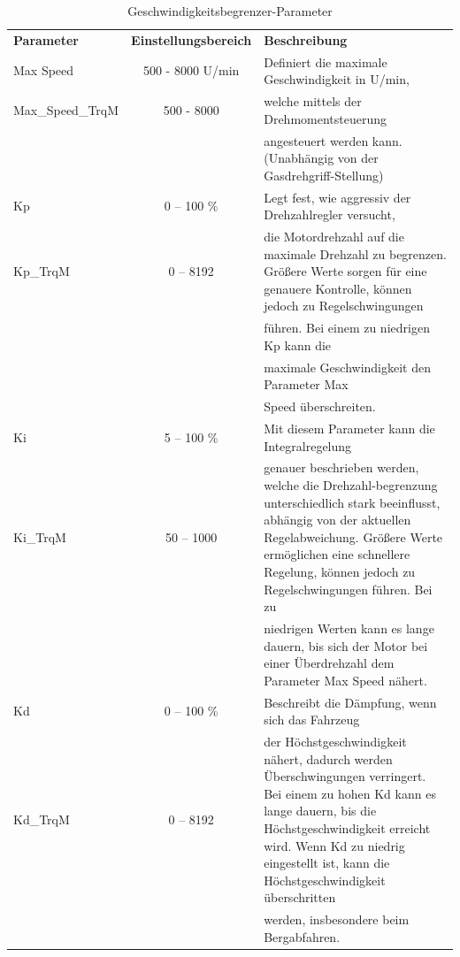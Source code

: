 \begin{table}[H]
	\begin{tabular}{|lcp{8cm}|}\hline
	\rowcolor[gray]{0.8}\textbf{Parameter} & \textbf{Einstellungsbereich} &\textbf{Beschreibung}\\[3pt]
		Max Speed & 500 - 8000 U/min & Definiert die maximale Geschwindigkeit in U/min,\\
		Max\_Speed\_TrqM & 500 - 8000	& welche mittels der Drehmomentsteuerung\\&& angesteuert werden kann. (Unabhängig von der Gasdrehgriff-Stellung)\\\hline
		Kp 	& 0 – 100 \% 	& Legt fest, wie aggressiv der Drehzahlregler versucht,\\
		Kp\_TrqM	& 0 – 8192			& die Motordrehzahl auf die maximale Drehzahl zu begrenzen. Größere Werte sorgen für eine genauere Kontrolle, können jedoch zu Regelschwingungen\\&& führen. Bei einem zu niedrigen Kp kann die\\&& maximale Geschwindigkeit den Parameter Max\\&& Speed überschreiten.\\\hline
		Ki 			& 5 – 100 \% 		& Mit diesem Parameter kann die Integralregelung\\
		Ki\_TrqM	& 50 – 1000 		& genauer beschrieben werden, welche die Drehzahl-begrenzung unterschiedlich stark beeinflusst, abhängig von der aktuellen Regelabweichung. Größere Werte ermöglichen eine schnellere Regelung, können jedoch zu Regelschwingungen führen. Bei zu\\&& niedrigen Werten kann es lange dauern, bis sich der Motor bei einer Überdrehzahl dem Parameter Max Speed nähert. \\\hline
		Kd    		& 0 – 100 \% 	& Beschreibt die Dämpfung, wenn sich das Fahrzeug\\
		Kd\_TrqM	& 0 – 8192	 	& der Höchstgeschwindigkeit nähert, dadurch werden Überschwingungen verringert. Bei einem zu hohen Kd kann es lange dauern, bis die Höchstgeschwindigkeit erreicht wird. Wenn Kd zu niedrig eingestellt ist, kann die Höchstgeschwindigkeit überschritten\\&& werden, insbesondere beim Bergabfahren. \\\hline	
	\end{tabular}	
	\caption{Geschwindigkeitsbegrenzer-Parameter}
	\label{tab:Geschwindigkeitsbegrenzer-Parameter}
\end{table}

\newpage

